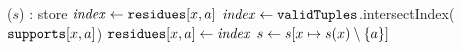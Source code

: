         \PROCEDURE \FilterDomains($s$) : store     \label{line:filterDom:0}
       \label{line:filterDom:2}
             \label{line:filterDom:3}
              \STATE $\mathit{index} \leftarrow \texttt{residues}[x,a]$ \label{line:filterDom:res1}
               \label{line:filterDom:res2} %
                  \STATE $\mathit{index} \leftarrow \texttt{validTuples}$.intersectIndex($\texttt{supports}[x,a]$) \label{line:filterDom:4}
                   \label{line:filterDom:5}
                        \STATE $\texttt{residues}[x,a] \leftarrow \mathit{index}$ \label{line:filterDom:6}
                  \ELSE
                        \STATE $s \leftarrow s[x \mapsto s(x) \setminus \left\{a\right\}]$ \label{line:filterDom:7}
                  \ENDIF
              \ENDIF
             \ENDFOREACH
      
      \ENDFOREACH

